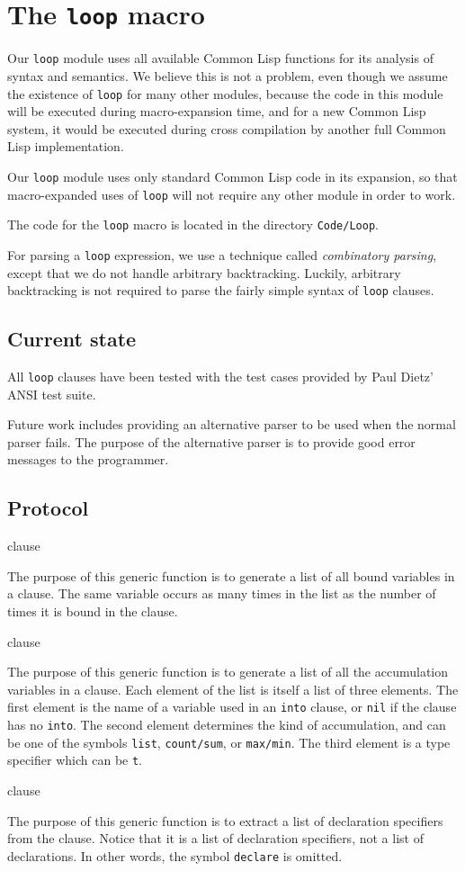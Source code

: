 \chapter{The \texttt{loop} macro} 

Our \texttt{loop} module uses all available Common Lisp functions for
its analysis of syntax and semantics.  We believe this is not a
problem, even though we assume the existence of \texttt{loop} for many
other modules, because the code in this module will be executed during
macro-expansion time, and for a new Common Lisp system, it would be
executed during cross compilation by another full Common Lisp
implementation.

Our \texttt{loop} module uses only standard Common Lisp code in its
expansion, so that macro-expanded uses of \texttt{loop} will not
require any other \sysname{} module in order to work.

The code for the \sysname{} \texttt{loop} macro is located in the
directory \texttt{Code/Loop}.  

For parsing a \texttt{loop} expression, we use a technique called
\emph{combinatory parsing}, except that we do not handle arbitrary
backtracking.  Luckily, arbitrary backtracking is not required to
parse the fairly simple syntax of \texttt{loop} clauses.

\section{Current state}

All \texttt{loop} clauses have been tested with the test cases
provided by Paul Dietz' ANSI \commonlisp{} test suite.

Future work includes providing an alternative parser to be used when
the normal parser fails.  The purpose of the alternative parser is to
provide good error messages to the programmer.

\section{Protocol}

 {clause}

The purpose of this generic function is to generate a list of all
bound variables in a clause.  The same variable occurs as many times
in the list as the number of times it is bound in the clause.

 {clause}

The purpose of this generic function is to generate a list of all the
accumulation variables in a clause.  Each element of the list is
itself a list of three elements.  The first element is the name of a
variable used in an \texttt{into} clause, or \texttt{nil} if the
clause has no \texttt{into}.  The second element determines the kind
of accumulation, and can be one of the symbols \texttt{list},
\texttt{count/sum}, or \texttt{max/min}.  The third element is a type
specifier which can be \texttt{t}.

 {clause}

The purpose of this generic function is to extract a list of
declaration specifiers from the clause.  Notice that it is a list of
declaration specifiers, not a list of declarations.  In other words,
the symbol \texttt{declare} is omitted.
